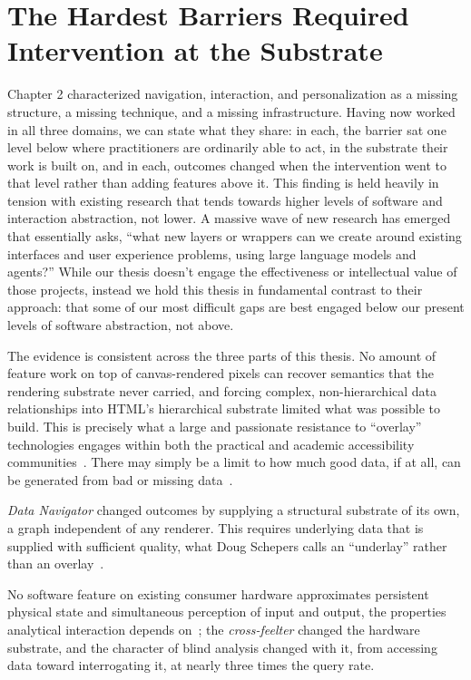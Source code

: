 \documentclass[12pt]{cmuthesis}
\begin{document}
\section{The Hardest Barriers Required Intervention at the Substrate}

Chapter 2 characterized navigation, interaction, and personalization as a missing structure, a missing technique, and a missing infrastructure. Having now worked in all three domains, we can state what they share: in each, the barrier sat one level below where practitioners are ordinarily able to act, in the substrate their work is built on, and in each, outcomes changed when the intervention went to that level rather than adding features above it. This finding is held heavily in tension with existing research that tends towards higher levels of software and interaction abstraction, not lower. A massive wave of new research has emerged that essentially asks, ``what new layers or wrappers can we create around existing interfaces and user experience problems, using large language models and agents?'' While our thesis doesn't engage the effectiveness or intellectual value of those projects, instead we hold this thesis in fundamental contrast to their approach: that some of our most difficult gaps are best engaged below our present levels of software abstraction, not above.

The evidence is consistent across the three parts of this thesis. No amount of feature work on top of canvas-rendered pixels can recover semantics that the rendering substrate never carried, and forcing complex, non-hierarchical data relationships into HTML's hierarchical substrate limited what was possible to build. This is precisely what a large and passionate resistance to ``overlay'' technologies engages within both the practical and academic accessibility communities~\cite{Makati2024,Egger2022,Hartman2025,Groves2023}. There may simply be a limit to how much good data, if at all, can be generated from bad or missing data~\cite{Paullada2021,Birhane2023}.

\textit{Data Navigator} changed outcomes by supplying a structural substrate of its own, a graph independent of any renderer. This requires underlying data that is supplied with sufficient quality, what Doug Schepers calls an ``underlay'' rather than an overlay~\cite{Schepers2026}.

No software feature on existing consumer hardware approximates persistent physical state and simultaneous perception of input and output, the properties analytical interaction depends on~\cite{Liu2014}; the \textit{cross-feelter} changed the hardware substrate, and the character of blind analysis changed with it, from accessing data toward interrogating it, at nearly three times the query rate.
\end{document}
